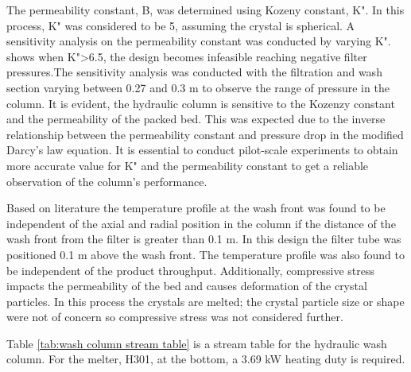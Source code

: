 The permeability constant, B, was determined using Kozeny constant, K".  In this process, K" was considered to be 5, assuming the crystal is spherical. A sensitivity analysis on the permeability constant was conducted by varying K".  shows when K">6.5, the design becomes infeasible reaching negative filter pressures.The sensitivity analysis was conducted with the filtration and wash section varying between 0.27 and 0.3 m to observe the range of pressure in the column. It is evident, the hydraulic column is sensitive to the Kozenzy constant and the permeability of the packed bed. This was expected due to the inverse relationship between the permeability constant and pressure drop in the modified Darcy's law equation. It is essential to conduct pilot-scale experiments to obtain more accurate value for K" and the permeability constant to get a reliable observation of the column's performance. 

Based on literature \cite{jansens_furification_1995} the temperature profile at the wash front was found to be independent of the axial and radial position in the column if the distance of the wash front from the filter is greater than 0.1 m. In this design the filter tube was positioned 0.1 m above the wash front. The temperature profile was also found to be independent of the product throughput. Additionally, compressive stress impacts the permeability of the bed and causes deformation of the crystal particles. In this process the crystals are melted; the crystal particle size or shape were not of concern so compressive stress was not considered further. 

Table \ref{tab:wash column stream table} is a stream table for the hydraulic wash column. For the melter, H301, at the bottom, a 3.69 kW heating duty is required.  

